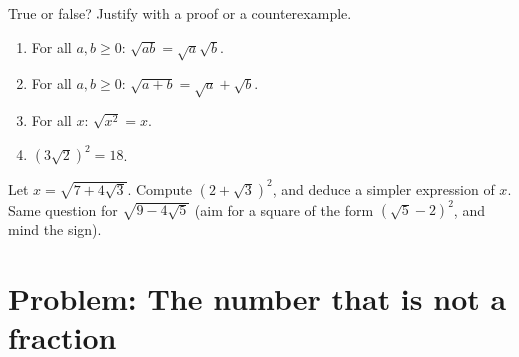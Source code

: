 \begin{exercise}[$\star\star$]\label{exo:g9:sqrt:9}
True or false? Justify with a proof or a counterexample.
\begin{enumerate}
  \item For all $a, b \geq 0$: $\sqrt{ab} = \sqrt a \sqrt b$.
  \item For all $a, b \geq 0$: $\sqrt{a+b} = \sqrt a + \sqrt b$.
  \item For all $x$: $\sqrt{x^2} = x$.
  \item $\left(3\sqrt2\right)^2 = 18$.
\end{enumerate}
\end{exercise}

\begin{exercise}[$\star\star\star$]\label{exo:g9:sqrt:10}
Let $x = \sqrt{7 + 4\sqrt3}$. Compute
$\left(2 + \sqrt3\right)^2$, and deduce a simpler expression of $x$.
Same question for $\sqrt{9 - 4\sqrt5}$ (aim for a square of the form
$\left(\sqrt5 - 2\right)^2$, and mind the sign).
\end{exercise}

\section{Problem: The number that is not a fraction}

